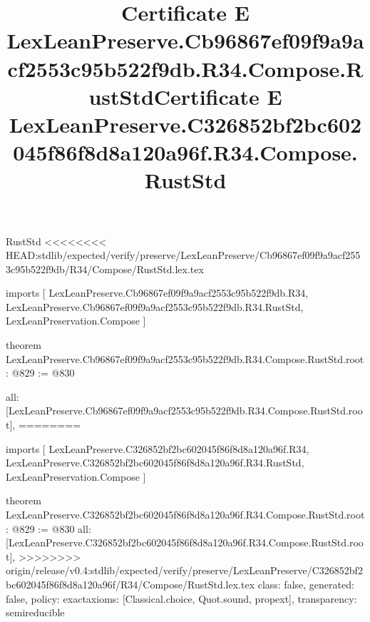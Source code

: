 \begin{lexlean}{RustStd}
<<<<<<<< HEAD:stdlib/expected/verify/preserve/LexLeanPreserve/Cb96867ef09f9a9acf2553c95b522f9db/R34/Compose/RustStd.lex.tex
\title{Certificate E LexLeanPreserve.Cb96867ef09f9a9acf2553c95b522f9db.R34.Compose.RustStd}
\begin{coremodule}
imports [
  LexLeanPreserve.Cb96867ef09f9a9acf2553c95b522f9db.R34,
  LexLeanPreserve.Cb96867ef09f9a9acf2553c95b522f9db.R34.RustStd,
  LexLeanPreservation.Compose
]

theorem LexLeanPreserve.Cb96867ef09f9a9acf2553c95b522f9db.R34.Compose.RustStd.root : @829 := @830 {
  all: [LexLeanPreserve.Cb96867ef09f9a9acf2553c95b522f9db.R34.Compose.RustStd.root],
========
\title{Certificate E LexLeanPreserve.C326852bf2bc602045f86f8d8a120a96f.R34.Compose.RustStd}
\begin{coremodule}
imports [
  LexLeanPreserve.C326852bf2bc602045f86f8d8a120a96f.R34,
  LexLeanPreserve.C326852bf2bc602045f86f8d8a120a96f.R34.RustStd,
  LexLeanPreservation.Compose
]

theorem LexLeanPreserve.C326852bf2bc602045f86f8d8a120a96f.R34.Compose.RustStd.root : @829 := @830 {
  all: [LexLeanPreserve.C326852bf2bc602045f86f8d8a120a96f.R34.Compose.RustStd.root],
>>>>>>>> origin/release/v0.4:stdlib/expected/verify/preserve/LexLeanPreserve/C326852bf2bc602045f86f8d8a120a96f/R34/Compose/RustStd.lex.tex
  class: false,
  generated: false,
  policy: exact{axioms: [Classical.choice, Quot.sound, propext]},
  transparency: semireducible
}


\end{coremodule}}
\end{coremodule}
\end{lexlean}
